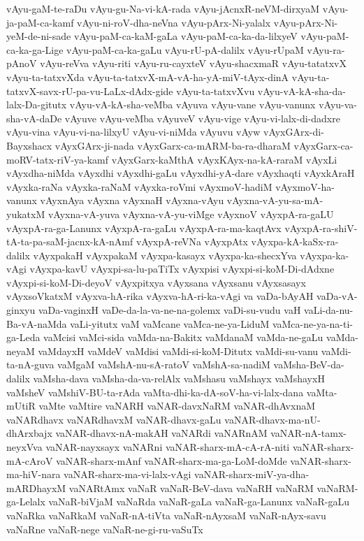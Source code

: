 {vAyu-gaM-te-raDu
vAyu-gu-Na-vi-kA-rada
vAyu-jAcnxR-neVM-dirxyaM
vAyu-ja-paM-ca-kamf
vAyu-ni-roV-dha-neVna
vAyu-pArx-Ni-yalalx
vAyu-pArx-Ni-yeM-de-ni-sade
vAyu-paM-ca-kaM-gaLa
vAyu-paM-ca-ka-da-lilxyeV
vAyu-paM-ca-ka-ga-Lige
vAyu-paM-ca-ka-gaLu
vAyu-rU-pA-dalilx
vAyu-rUpaM
vAyu-ra-pAnoV
vAyu-reVva
vAyu-riti
vAyu-ru-cayxteV
vAyu-shacxmaR
vAyu-tatatxvX
vAyu-ta-tatxvXda
vAyu-ta-tatxvX-mA-vA-ha-yA-miV-tAyx-dinA
vAyu-ta-tatxvX-savx-rU-pa-vu-LaLx-dAdx-gide
vAyu-ta-tatxvXvu
vAyu-vA-kA-sha-da-lalx-Da-gitutx
vAyu-vA-kA-sha-veMba
vAyuva
vAyu-vane
vAyu-vanunx
vAyu-va-sha-vA-daDe
vAyuve
vAyu-veMba
vAyuveV
vAyu-vige
vAyu-vi-lalx-di-dadxre
vAyu-vina
vAyu-vi-na-lilxyU
vAyu-vi-niMda
vAyuvu
vAyw
vAyxGArx-di-Bayxshacx
vAyxGArx-ji-nada
vAyxGarx-ca-mARM-ba-ra-dharaM
vAyxGarx-ca-moRV-tatx-riV-ya-kamf
vAyxGarx-kaMthA
vAyxKAyx-na-kA-raraM
vAyxLi
vAyxdha-niMda
vAyxdhi
vAyxdhi-gaLu
vAyxdhi-yA-dare
vAyxhaqti
vAyxkAraH
vAyxka-raNa
vAyxka-raNaM
vAyxka-roVmi
vAyxmoV-hadiM
vAyxmoV-ha-vanunx
vAyxnAya
vAyxna
vAyxnaH
vAyxna-vAyu
vAyxna-vA-yu-sa-mA-yukatxM
vAyxna-vA-yuva
vAyxna-vA-yu-viMge
vAyxnoV
vAyxpA-ra-gaLU
vAyxpA-ra-ga-Lanunx
vAyxpA-ra-gaLu
vAyxpA-ra-ma-kaqtAvx
vAyxpA-ra-shiV-tA-ta-pa-saM-jacnx-kA-nAmf
vAyxpA-reVNa
vAyxpAtx
vAyxpa-kA-kaSx-ra-dalilx
vAyxpakaH
vAyxpakaM
vAyxpa-kasayx
vAyxpa-ka-shecxYva
vAyxpa-ka-vAgi
vAyxpa-kavU
vAyxpi-sa-lu-paTiTx
vAyxpisi
vAyxpi-si-koM-Di-dAdxne
vAyxpi-si-koM-Di-deyoV
vAyxpitxya
vAyxsana
vAyxsanu
vAyxsasayx
vAyxsoVkatxM
vAyxva-hA-rika
vAyxva-hA-ri-ka-vAgi
va
vaDa-bAyAH
vaDa-vA-ginxyu
vaDa-vaginxH
vaDe-da-la-va-ne-na-golemx
vaDi-su-vudu
vaH
vaLi-da-nu-Ba-vA-naMda
vaLi-yitutx
vaM
vaMcane
vaMca-ne-ya-LiduM
vaMca-ne-ya-na-ti-ga-Leda
vaMcisi
vaMci-sida
vaMda-na-Bakitx
vaMdanaM
vaMda-ne-gaLu
vaMda-neyaM
vaMdayxH
vaMdeV
vaMdisi
vaMdi-si-koM-Ditutx
vaMdi-su-vanu
vaMdi-ta-nA-guva
vaMgaM
vaMshA-nu-sA-ratoV
vaMshA-sa-nadiM
vaMsha-BeV-da-dalilx
vaMsha-dava
vaMsha-da-va-relAlx
vaMshasu
vaMshayx
vaMshayxH
vaMsheV
vaMshiV-BU-ta-rAda
vaMta-dhi-ka-dA-soV-ha-vi-lalx-dana
vaMta-mUtiR
vaMte
vaMtire
vaNARH
vaNAR-davxNaRM
vaNAR-dhAvxnaM
vaNARdhavx
vaNARdhavxM
vaNAR-dhavx-gaLu
vaNAR-dhavx-ma-nU-dhArxbajx
vaNAR-dhavx-nA-makAH
vaNARdi
vaNARnAM
vaNAR-nA-tamx-neyxVva
vaNAR-nayxsayx
vaNARni
vaNAR-sharx-mA-cA-rA-niti
vaNAR-sharx-mA-cAroV
vaNAR-sharx-mAnf
vaNAR-sharx-ma-ga-LoM-doMde
vaNAR-sharx-ma-hiV-nara
vaNAR-sharx-ma-vi-lalx-vAgi
vaNAR-sharx-miV-ya-dha-mARDhayxM
vaNARtAmx
vaNaR
vaNaR-BeV-dava
vaNaRH
vaNaRM
vaNaRM-ga-Lelalx
vaNaR-biVjaM
vaNaRda
vaNaR-gaLa
vaNaR-ga-Lanunx
vaNaR-gaLu
vaNaRka
vaNaRkaM
vaNaR-nA-tiVta
vaNaR-nAyxsaM
vaNaR-nAyx-savu
vaNaRne
vaNaR-nege
vaNaR-ne-gi-ru-vaSuTx
}
